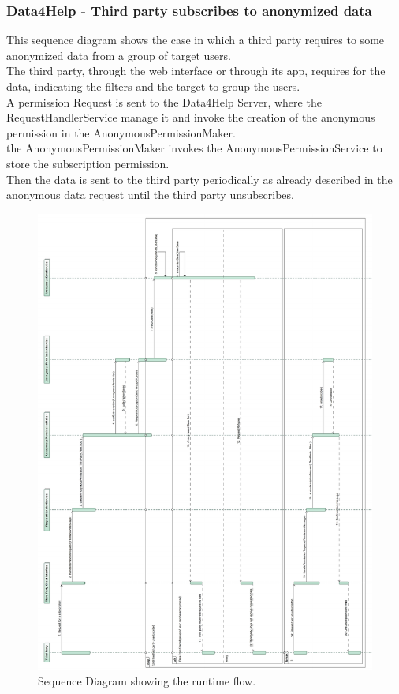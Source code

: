\documentclass[a4paper]{article}
\begin{document}
\subsubsection{Data4Help - Third party subscribes to anonymized data}
This sequence diagram shows the case in which a third party requires to some anonymized data from a group of target users. \\
The third party, through the web interface or through its app, requires for the data, indicating the filters and the target to group the users. \\
A permission Request is sent to the Data4Help Server, where the RequestHandlerService manage it and invoke the creation of the anonymous permission in the AnonymousPermissionMaker. \\
the AnonymousPermissionMaker invokes the AnonymousPermissionService to store the subscription permission. \\
Then the data is sent to the third party periodically as already described in the anonymous data request until the third party unsubscribes. 

\begin{figure}[H]
    \centering
    \includegraphics[width=\linewidth]{SequenceDiagram-RequestForSubscription}
    \caption{Sequence Diagram showing the runtime flow.}
    \label{fig:my_label}
\end{figure}
\clearpage
\end{document}

